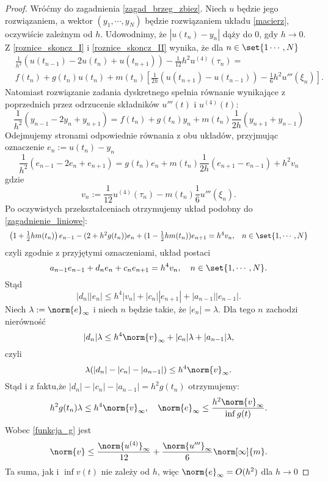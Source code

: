 \begin{proof}
Wróćmy do zagadnienia \eqref{zagad_brzeg_zbiez}. Niech $u$ będzie jego rozwiązaniem, a wektor $(y_1,\cdots,y_N)$ będzie rozwiązaniem układu \eqref{macierz}, oczywiście zależnym od $h$. Udowodnimy, że $|u(t_n) - y_n|$ dąży do $0$, gdy $h \to 0$. Z \eqref{roznice_skoncz_I} i \eqref{roznice_skoncz_II} wynika, że dla $ n \in \set{1\cdots,N}$
\begin{align*}
&\frac{1}{h^2} (u(t_{n-1}) - 2u(t_n) + u(t_{n+1})) - \frac{1}{12}h^2u^{(4)}(\tau_{n}) =\\
&f(t_n) + g(t_n)u(t_n) + m(t_n)\left[\frac{1}{2h}(u(t_{n+1}) - u(t_{n-1})) - \frac{1}{6}h^2u'''(\xi_n)\right].
\end{align*}
Natomiast rozwiązanie zadania dyskretnego spełnia równanie wynikające z poprzednich przez odrzucenie składników $u'''(t)$ i $u^{(4)}(t)$:
$$
\frac{1}{h^2}(y_{n-1} -2y_n + y_{n+1})= f(t_n)+g(t_n) y_n + m(t_n) \frac{1}{2h} (y_{n+1}+y_{n-1})
$$
Odejmujemy stronami odpowiednie równania z obu układów, przyjmując oznaczenie $e_n:=u(t_n) - y_n$
\begin{equation}
\frac{1}{h^2}(e_{n-1} - 2e_n + e_{n+1}) = g(t_n) e_n + m(t_n) \frac{1}{2h}(e_{n+1} - e_{n-1})+ h^2 v_n
\end{equation}
gdzie 
\begin{equation}\label{funkcja_g}
v_n:= \frac{1}{12} u^{(4)}(\tau_n) - m(t_n) \frac{1}{6} u'''(\xi_n).
\end{equation}
Po oczywistych przekształceniach otrzymujemy układ podobny do \eqref{zagadnienie_liniowe}:
$$
\begin{array}{cl}
\left(1+ \frac{1}{2}h m(t_n) \right)e_{n-1} - (2+ h^2 g(t_n) )e_n + (1- \frac{1}{2}h m(t_n) )e_{n+1} = h^4 v_n ,& n \in \set{1,\cdots,N}
\end{array}
$$
czyli zgodnie z przyjętymi oznaczeniami, układ postaci
$$
a_{n-1}e_{n-1} + d_ne_n + c_ne_{n+1} = h^4 v_n, \quad n \in \set{1,\cdots,N}.
$$
Stąd 
$$
|d_n||e_n| \leq h^4|v_n| + |c_n||e_{n+1}| + |a_{n-1}||e_{n-1}|.
$$
Niech $\lambda := {\norm{e}}_\infty$ i niech $n$ będzie takie, że $|e_n| = \lambda$. Dla tego $n$ zachodzi nierówność
$$
|d_n|\lambda \leq h^4 {\norm{v}}_\infty + |c_n|\lambda + |a_{n -1}|\lambda,
$$
czyli 
$$
\lambda(|d_n|-|c_n|-|a_{n-1}|) \leq h^4 {\norm{v}}_\infty.
$$
Stąd i z faktu,że $|d_n|-|c_n|-|a_{n-1}| = h^2 g(t_n)$ otrzymujemy:
$$
h^2 g(t_n) \lambda \leq h^4  {\norm{v}}_\infty, \quad {\norm{e}}_\infty \leq \frac{h^2 {\norm{v}}_\infty}{\inf g(t)}.
$$
Wobec \eqref{funkcja_g} jest
$$
\norm{v} \leq \frac{{\norm{u^{(4)}}}_\infty}{12}+\frac{{\norm{u'''}}_\infty}{6} \norm[\infty]{m}.
$$
Ta suma, jak i $\inf v(t)$ nie zależy od $h$, więc ${\norm{e}}_\infty = O(h^2)$ dla $h \to 0$ 
\end{proof}





